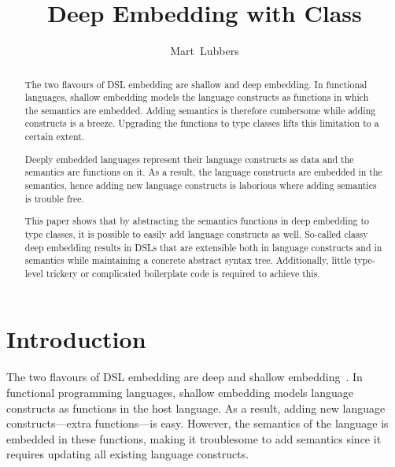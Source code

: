 \documentclass[runningheads]{llncs}
\begin{document}
\title{Deep Embedding with Class}
\author{Mart~Lubbers}

\maketitle
	
\begin{abstract}
	The two flavours of DSL embedding are shallow and deep embedding.
	In functional languages, shallow embedding models the language constructs as functions in which the semantics are embedded.
	Adding semantics is therefore cumbersome while adding constructs is a breeze.
	Upgrading the functions to type classes lifts this limitation to a certain extent.

	Deeply embedded languages represent their language constructs as data and the semantics are functions on it.
	As a result, the language constructs are embedded in the semantics, hence adding new language constructs is laborious where adding semantics is trouble free.

	This paper shows that by abstracting the semantics functions in deep embedding to type classes, it is possible to easily add language constructs as well.
	So-called classy deep embedding results in DSLs that are extensible both in language constructs and in semantics while maintaining a concrete abstract syntax tree.
	Additionally, little type-level trickery or complicated boilerplate code is required to achieve this.
\end{abstract}

\section{Introduction}%
\label{sec:intro}

The two flavours of DSL embedding are deep and shallow embedding~\cite{boulton_experience_1992}.
In functional programming languages, shallow embedding models language constructs as functions in the host language.
As a result, adding new language constructs---extra functions---is easy.
However, the semantics of the language is embedded in these functions, making it troublesome to add semantics since it requires updating all existing language constructs.
\end{document}
